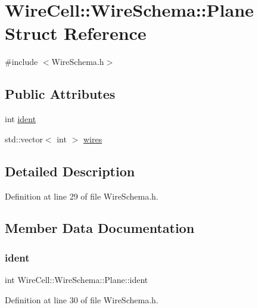 \hypertarget{struct_wire_cell_1_1_wire_schema_1_1_plane}{}\section{Wire\+Cell\+:\+:Wire\+Schema\+:\+:Plane Struct Reference}
\label{struct_wire_cell_1_1_wire_schema_1_1_plane}


{\ttfamily \#include $<$Wire\+Schema.\+h$>$}

\subsection*{Public Attributes}
\begin{DoxyCompactItemize}
\item 
int \hyperlink{struct_wire_cell_1_1_wire_schema_1_1_plane_aa77a3d78e86cd3cd9840600a3939d6c1}{ident}
\item 
std\+::vector$<$ int $>$ \hyperlink{struct_wire_cell_1_1_wire_schema_1_1_plane_a3364c87f0c03bf1475e10328ed977585}{wires}
\end{DoxyCompactItemize}


\subsection{Detailed Description}


Definition at line 29 of file Wire\+Schema.\+h.



\subsection{Member Data Documentation}
\mbox{\label{struct_wire_cell_1_1_wire_schema_1_1_plane_aa77a3d78e86cd3cd9840600a3939d6c1}} 
\subsubsection{\texorpdfstring{ident}{ident}}
{\footnotesize\ttfamily int Wire\+Cell\+::\+Wire\+Schema\+::\+Plane\+::ident}



Definition at line 30 of file Wire\+Schema.\+h.

